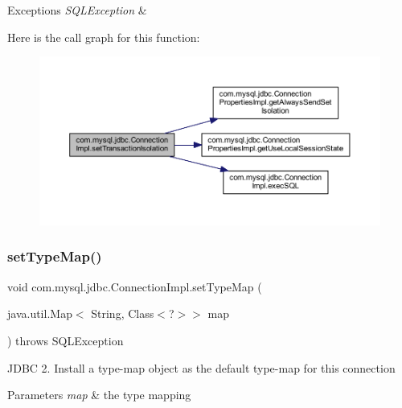 \begin{DoxyExceptions}{Exceptions}
{\em S\+Q\+L\+Exception} & \\
\hline
\end{DoxyExceptions}
Here is the call graph for this function\+:\nopagebreak
\begin{figure}[H]
\begin{center}
\leavevmode
\includegraphics[width=350pt]{classcom_1_1mysql_1_1jdbc_1_1_connection_impl_afdba9c661537b2fddb5e4987f5b5538f_cgraph}
\end{center}
\end{figure}
\mbox{\label{classcom_1_1mysql_1_1jdbc_1_1_connection_impl_a0b2be15b1d06a182b30cae87bdfcf91b}} 
\subsubsection{\texorpdfstring{set\+Type\+Map()}{setTypeMap()}}
{\footnotesize\ttfamily void com.\+mysql.\+jdbc.\+Connection\+Impl.\+set\+Type\+Map (\begin{DoxyParamCaption}\item[{java.\+util.\+Map$<$ String, Class$<$?$>$$>$}]{map }\end{DoxyParamCaption}) throws S\+Q\+L\+Exception}

J\+D\+BC 2. Install a type-\/map object as the default type-\/map for this connection


\begin{DoxyParams}{Parameters}
{\em map} & the type mapping \\
\hline
\end{DoxyParams}

